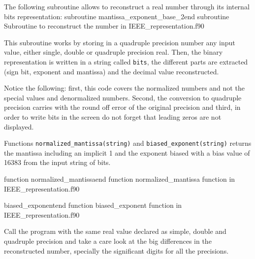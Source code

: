 The following subroutine allows to reconstruct a real number through its internal bits representation: 
\vspace{0.5cm}
{subroutine mantissa_exponent_base_2}{end subroutine}
{Subroutine to reconstruct the number in IEEE_representation.f90} 


This subroutine works by storing in a quadruple precision number any input value, 
either single, double or quadruple precision real. Then,  
the binary representation is written in a string called \texttt{bits}, 
the different parts are extracted (sign bit, exponent and mantissa) 
and the decimal value reconstructed. 

Notice the following: 
first, this code covers the normalized numbers and not the special values and denormalized numbers. 
Second, the conversion to quadruple precision carries with the round off error of the original precision and 
third, in order to write bits in the screen do not forget that leading zeros are not displayed.

Functions \texttt{normalized\_mantissa(string)} and \texttt{biased\_exponent(string)} returns the mantissa including an implicit 1 and the exponent biased with a bias value of 16383 from the input string of bits. 

{function normalized_mantissa}{end function}
{normalized_mantissa function in IEEE_representation.f90} 

{biased_exponent}{end function}
{biased_exponent function in IEEE_representation.f90} 

Call the program with the same real value declared as simple, double and quadruple precision and take a care look at the big differences in the reconstructed number, specially the significant digits for all the precisions. 







 






































